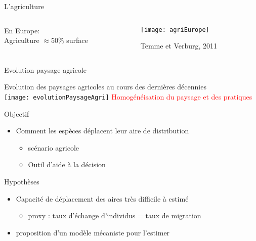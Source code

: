 \documentclass[]{beamer}
\begin{document}
\begin{frame}{L'agriculture}
 \begin{columns}[c]
    \begin{column}[c]{0.4\textwidth}
     \begin{center}
       En Europe: \\ Agriculture $\approx 50\%$  surface 
     \end{center}
    \end{column}
     \begin{column}[c]{0.6\textwidth}
      \begin{center}
     \texttt{[image: agriEurope]}
      \end{center}
      \begin{tiny}
    Temme et Verburg, 2011
  \end{tiny}
    \end{column}
  \end{columns}
\end{frame}

\begin{frame}{Evolution paysage agricole}
\begin{center}
Evolution des paysages agricoles au cours des dernières décennies \\
\vspace{10pt}
 \texttt{[image: evolutionPaysageAgri]}
 \vspace{10pt}
 \textcolor{red}{Homogénéisation du paysage et des pratiques}
 \end{center}
\end{frame}



 
 
 \begin{frame}{Objectif}
   \begin{itemize}[<+->]
      \item Comment les espèces déplacent leur aire de distribution
    \begin{itemize}
     \item scénario agricole
     \item Outil d'aide à la décision
    \end{itemize}
    \end{itemize}
\end{frame}

 \begin{frame}{Hypothèses}
   \begin{itemize}[<+->]
      \item Capacité de déplacement des aires très difficile à estimé
    \begin{itemize}
     \item proxy : taux d'échange d'individus = taux de migration    
    \end{itemize}
    \item proposition d'un modèle mécaniste pour l'estimer
    \end{itemize}
\end{frame}
\end{document}
